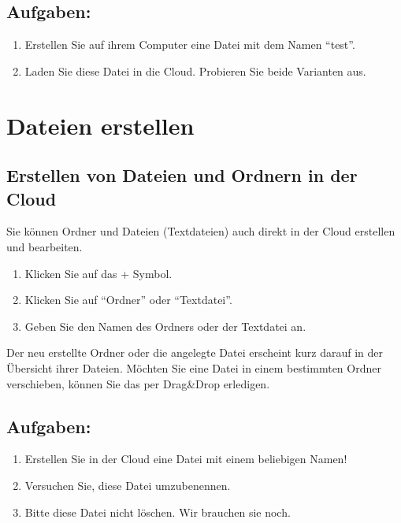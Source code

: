 \documentclass[letterpaper,10pt,ngerman]{sphinxmanual}
\begin{document}
\section{Aufgaben:}
\label{Dateien hochladen:aufgaben}\begin{enumerate}
\item {} 
Erstellen Sie auf ihrem Computer eine Datei mit dem Namen ``test''.

\item {} 
Laden Sie diese Datei in die Cloud. Probieren Sie beide Varianten aus.

\end{enumerate}


\chapter{Dateien erstellen}
\label{Dateien erstellen:dateien-erstellen}\label{Dateien erstellen::doc}

\section{Erstellen von Dateien und Ordnern in der Cloud}
\label{Dateien erstellen:erstellen-von-dateien-und-ordnern-in-der-cloud}\label{Dateien erstellen:erstellen-sk}
Sie können Ordner und Dateien (Textdateien) auch direkt in der Cloud erstellen und bearbeiten.
\begin{enumerate}
\item {} 
Klicken Sie auf das + Symbol.

\item {} 
Klicken Sie auf ``Ordner'' oder ``Textdatei''.

\item {} 
Geben Sie den Namen des Ordners oder der Textdatei an.

\end{enumerate}

Der neu erstellte Ordner oder die angelegte Datei erscheint kurz darauf in der Übersicht ihrer Dateien.
Möchten Sie eine Datei in einem bestimmten Ordner verschieben, können Sie das per Drag\&Drop erledigen.


\section{Aufgaben:}
\label{Dateien erstellen:aufgaben}\begin{enumerate}
\item {} 
Erstellen Sie in der Cloud eine Datei mit einem beliebigen Namen!

\item {} 
Versuchen Sie, diese Datei umzubenennen.

\item {} 
Bitte diese Datei nicht löschen. Wir brauchen sie noch.

\end{enumerate}
\end{document}
